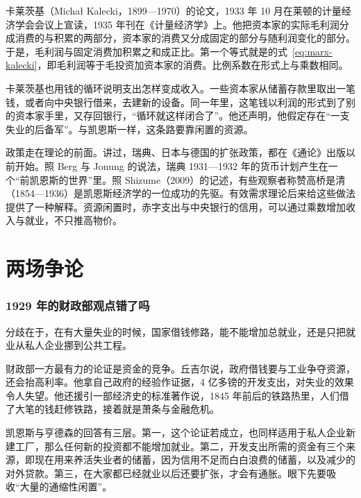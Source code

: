 卡莱茨基（Michał Kalecki，1899—1970）的论文，1933 年 10 月在莱顿的计量经济学会会议上宣读，1935 年刊在《计量经济学》上\cite{kalecki1935,bnf32}。他把资本家的实际毛利润分成消费的与积累的两部分，资本家的消费又分成固定的部分与随利润变化的部分\cite{kalecki1935}。于是，毛利润与固定消费加积累之和成正比\cite{kalecki1935}。第一个等式就是的式~\eqref{eq:marx-kalecki}，即毛利润等于毛投资加资本家的消费。比例系数在形式上与乘数相同。

卡莱茨基也用钱的循环说明支出怎样变成收入。一些资本家从储蓄存款里取出一笔钱，或者向中央银行借来，去建新的设备\cite{kalecki1935}。同一年里，这笔钱以利润的形式到了别的资本家手里，又存回银行，“循环就这样闭合了”\cite{kalecki1935}。他还声明，他假定存在“一支失业的后备军”\cite{kalecki1935}。与凯恩斯一样，这条路要靠闲置的资源。

政策走在理论的前面。讲过，瑞典、日本与德国的扩张政策，都在《通论》出版以前开始。照 Berg 与 Jonung 的说法，瑞典 1931—1932 年的货币计划产生在一个“前凯恩斯的世界”里\cite{berg1998}。照 Shizume（2009）的记述，有些观察者称赞高桥是清（1854—1936）是凯恩斯经济学的一位成功的先驱\cite{shizume2009,loc32}。有效需求理论后来给这些做法提供了一种解释。资源闲置时，赤字支出与中央银行的信用，可以通过乘数增加收入与就业，不只推高物价。

\section{两场争论}\label{sec:generaltheory-debate}

\subsubsection{1929 年的财政部观点错了吗}
分歧在于，在有大量失业的时候，国家借钱修路，能不能增加总就业，还是只把就业从私人企业挪到公共工程。

财政部一方最有力的论证是资金的竞争。丘吉尔说，政府借钱要与工业争夺资源，还会抬高利率\cite{hansard1929}。他拿自己政府的经验作证据，4 亿多镑的开发支出，对失业的效果令人失望\cite{hansard1929}。他还援引一部经济史的标准著作说，1845 年前后的铁路热里，人们借了大笔的钱赶修铁路，接着就是萧条与金融危机\cite{hansard1929}。

凯恩斯与亨德森的回答有三层。第一，这个论证若成立，也同样适用于私人企业新建工厂，那么任何新的投资都不能增加就业\cite{keynes1929c}。第二，开发支出所需的资金有三个来源，即现在用来养活失业者的储蓄，因为信用不足而白白浪费的储蓄，以及减少的对外贷款\cite{keynes1929c}。第三，在大家都已经就业以后还要扩张，才会有通胀\cite{keynes1929c}。眼下先要吸收“大量的通缩性闲置”\cite{keynes1929c}。

